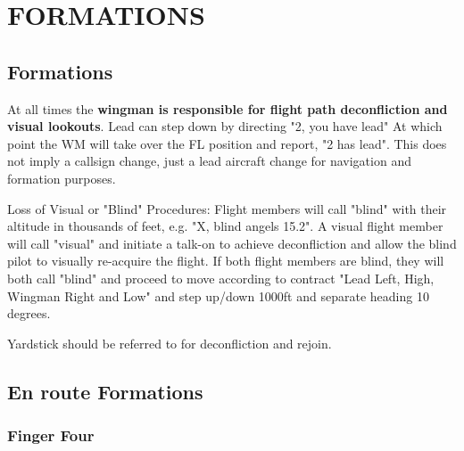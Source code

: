 \section{FORMATIONS}

\subsection{Formations}

At all times the \textbf{wingman is responsible for flight path deconfliction
and visual lookouts}.  Lead can step down by directing "2, you have lead" At
which point the WM will take over the FL position and report, "2 has lead". This
does not imply a callsign change, just a lead aircraft change for navigation and
formation purposes.

Loss of Visual or "Blind" Procedures: Flight members will call "blind" with
their altitude in thousands of feet, e.g. "X, blind angels 15.2". A visual
flight member will call "visual" and initiate a talk-on to achieve
deconfliction and allow the blind pilot to visually re-acquire the flight. If
both flight members are blind, they will both call "blind" and proceed to move
according to contract "Lead Left, High, Wingman Right and Low" and step up/down
1000ft and separate heading 10 degrees.

Yardstick should be referred to for deconfliction and rejoin.

\subsection{En route Formations}


\subsubsection{Finger Four}

